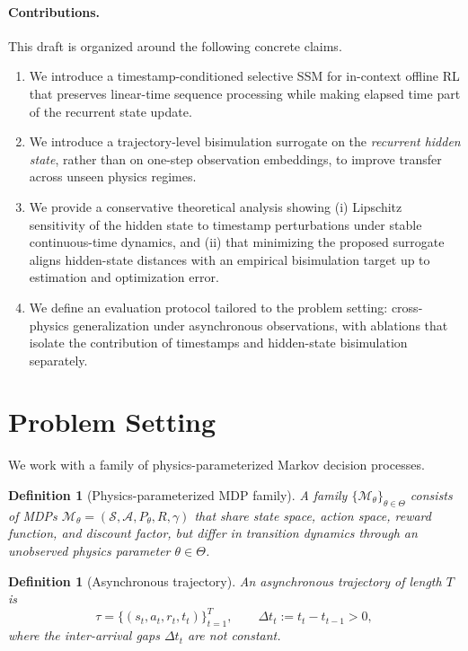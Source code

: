 \documentclass[11pt]{article}
\newtheorem{definition}[theorem]{Definition}
\newcommand{\cM}{\mathcal{M}}
\newcommand{\cS}{\mathcal{S}}
\newcommand{\cA}{\mathcal{A}}
\newcommand{\dt}{\Delta t}
\newcommand{\traj}{\tau}
\newcommand{\phys}{\theta}
\newcommand{\physspace}{\Theta}
\begin{document}
\paragraph{Contributions.}
This draft is organized around the following concrete claims.
\begin{enumerate}
    \item We introduce a timestamp-conditioned selective SSM for in-context offline RL that preserves linear-time sequence processing while making elapsed time part of the recurrent state update.
    \item We introduce a trajectory-level bisimulation surrogate on the \emph{recurrent hidden state}, rather than on one-step observation embeddings, to improve transfer across unseen physics regimes.
    \item We provide a conservative theoretical analysis showing (i) Lipschitz sensitivity of the hidden state to timestamp perturbations under stable continuous-time dynamics, and (ii) that minimizing the proposed surrogate aligns hidden-state distances with an empirical bisimulation target up to estimation and optimization error.
    \item We define an evaluation protocol tailored to the problem setting: cross-physics generalization under asynchronous observations, with ablations that isolate the contribution of timestamps and hidden-state bisimulation separately.
\end{enumerate}

\section{Problem Setting}

We work with a family of physics-parameterized Markov decision processes.

\begin{definition}[Physics-parameterized MDP family]
A family $\{\cM_{\phys}\}_{\phys\in\physspace}$ consists of MDPs $\cM_{\phys}=(\cS,\cA,P_{\phys},R,\gamma)$ that share state space, action space, reward function, and discount factor, but differ in transition dynamics through an unobserved physics parameter $\phys \in \physspace$.
\end{definition}

\begin{definition}[Asynchronous trajectory]
An asynchronous trajectory of length $T$ is
\[
\traj = \{(s_t,a_t,r_t,t_t)\}_{t=1}^{T}, \qquad \dt_t := t_t-t_{t-1}>0,
\]
where the inter-arrival gaps $\dt_t$ are not constant.
\end{definition}
\end{document}
